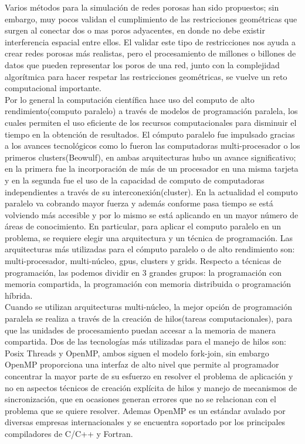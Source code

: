Varios m\'etodos para la simulaci\'on de redes porosas han sido propuestos; sin embargo, muy pocos validan el cumplimiento de las restricciones geom\'etricas que surgen al conectar dos o mas poros adyacentes, en donde no debe existir interferencia espacial entre ellos. El validar este tipo de restricciones nos ayuda a crear redes porosas m\'as realistas,
pero el procesamiento de millones o billones de datos que pueden representar los poros de una red, junto con la complejidad algor\'itmica para hacer respetar las restricciones geom\'etricas, se vuelve un reto computacional importante.\\

Por lo general la computación científica hace uso  del computo de alto rendimiento(computo paralelo) a través de modelos de programación paralela, los cuales permiten  el uso eficiente de los recursos computacionales para disminuir el tiempo en la obtenci\'on de resultados.
El c\'omputo paralelo fue impulsado gracias a los avances tecnológicos como lo fueron las computadoras multi-procesador o los primeros clusters(Beowulf), en ambas arquitecturas hubo un avance significativo; en la primera fue la incorporación de más de un procesador en una misma tarjeta y en la segunda fue el uso de la capacidad de computo de computadoras independientes a través de su interconexión(cluster). En la actualidad el computo paralelo va cobrando mayor fuerza y adem\'as conforme pasa tiempo se est\'a volviendo más accesible y por lo mismo se est\'a aplicando en un mayor número de áreas de conocimiento. En particular, para aplicar el computo paralelo en un problema, se requiere elegir una arquitectura y un técnica de programación. Las arquitecturas más utilizadas para el cómputo paralelo o de alto rendimiento son: multi-procesador, multi-núcleo, gpus, clusters y grids. Respecto a técnicas de programación,  las podemos dividir en 3 grandes grupos: la programación con memoria compartida, la programación con memoria distribuida o programación híbrida.\\

Cuando se utilizan arquitecturas multi-núcleo, la mejor opci\'on de programación paralela se realiza a través de la creaci\'on de hilos(tareas computacionales), para que las unidades de procesamiento puedan accesar a la memoria de manera compartida. Dos de las tecnologías más utilizadas para el manejo de hilos son: Posix Threads\cite{ref13} y OpenMP\cite{ref6}, ambos siguen el modelo fork-join, sin embargo OpenMP proporciona una interfaz de alto nivel que permite al programador concentrar la mayor parte de su esfuerzo en resolver el problema de aplicaci\'on y no en aspectos técnicos de creaci\'on expl\'icita de hilos y manejo de mecanismos de sincronizaci\'on, que en ocasiones generan errores que no se relacionan con el problema que se quiere resolver. Ademas OpenMP es un estándar avalado por diversas empresas internacionales y se encuentra soportado por los principales compiladores de C/C++ y Fortran.\\ 

